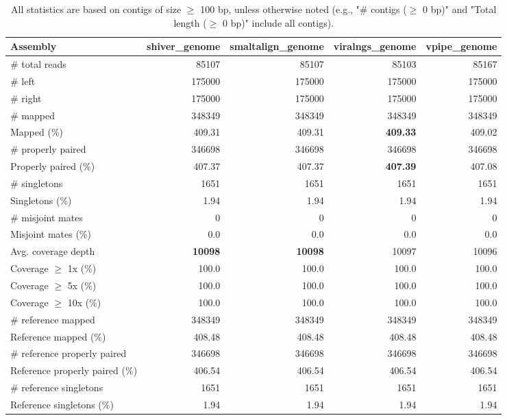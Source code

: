\documentclass[12pt,a4paper]{article}
\begin{document}
\begin{table}[ht]
\begin{center}
\caption{All statistics are based on contigs of size $\geq$ 100 bp, unless otherwise noted (e.g., "\# contigs ($\geq$ 0 bp)" and "Total length ($\geq$ 0 bp)" include all contigs).}
\begin{tabular}{|l*{4}{|r}|}
\hline
Assembly & shiver\_genome & smaltalign\_genome & viralngs\_genome & vpipe\_genome \\ \hline
\# total reads & 85107 & 85107 & 85103 & 85167 \\ \hline
\# left & 175000 & 175000 & 175000 & 175000 \\ \hline
\# right & 175000 & 175000 & 175000 & 175000 \\ \hline
\# mapped & 348349 & 348349 & 348349 & 348349 \\ \hline
Mapped (\%) & 409.31 & 409.31 & {\bf 409.33} & 409.02 \\ \hline
\# properly paired & 346698 & 346698 & 346698 & 346698 \\ \hline
Properly paired (\%) & 407.37 & 407.37 & {\bf 407.39} & 407.08 \\ \hline
\# singletons & 1651 & 1651 & 1651 & 1651 \\ \hline
Singletons (\%) & 1.94 & 1.94 & 1.94 & 1.94 \\ \hline
\# misjoint mates & 0 & 0 & 0 & 0 \\ \hline
Misjoint mates (\%) & 0.0 & 0.0 & 0.0 & 0.0 \\ \hline
Avg. coverage depth & {\bf 10098} & {\bf 10098} & 10097 & 10096 \\ \hline
Coverage $\geq$ 1x (\%) & 100.0 & 100.0 & 100.0 & 100.0 \\ \hline
Coverage $\geq$ 5x (\%) & 100.0 & 100.0 & 100.0 & 100.0 \\ \hline
Coverage $\geq$ 10x (\%) & 100.0 & 100.0 & 100.0 & 100.0 \\ \hline
\# reference mapped & 348349 & 348349 & 348349 & 348349 \\ \hline
Reference mapped (\%) & 408.48 & 408.48 & 408.48 & 408.48 \\ \hline
\# reference properly paired & 346698 & 346698 & 346698 & 346698 \\ \hline
Reference properly paired (\%) & 406.54 & 406.54 & 406.54 & 406.54 \\ \hline
\# reference singletons & 1651 & 1651 & 1651 & 1651 \\ \hline
Reference singletons (\%) & 1.94 & 1.94 & 1.94 & 1.94 \\ \hline

\end{tabular}
\end{center}
\end{table}
\end{document}
